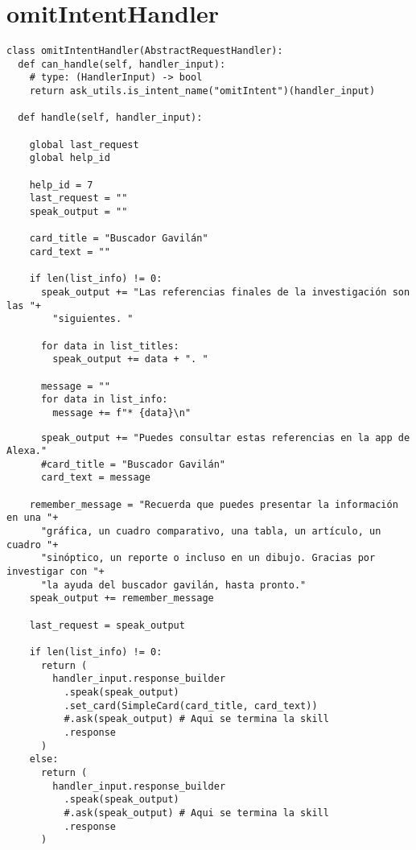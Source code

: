 
\section{omitIntentHandler}
\label{A13Anexo}

\begin{tcolorbox}[colback=white!25!white,colframe=blue]
  \begin{verbatim}
class omitIntentHandler(AbstractRequestHandler):
  def can_handle(self, handler_input):
    # type: (HandlerInput) -> bool
    return ask_utils.is_intent_name("omitIntent")(handler_input)

  def handle(self, handler_input):
        
    global last_request
    global help_id
        
    help_id = 7
    last_request = ""
    speak_output = ""
        
    card_title = "Buscador Gavilán"
    card_text = ""
        
    if len(list_info) != 0:
      speak_output += "Las referencias finales de la investigación son las "+
        "siguientes. "
            
      for data in list_titles:
        speak_output += data + ". "
            
      message = ""
      for data in list_info:
        message += f"* {data}\n"
  \end{verbatim}
\end{tcolorbox}

\begin{tcolorbox}[colback=white!25!white,colframe=blue]
  \begin{verbatim}
      speak_output += "Puedes consultar estas referencias en la app de Alexa."
      #card_title = "Buscador Gavilán"
      card_text = message
      
    remember_message = "Recuerda que puedes presentar la información en una "+
      "gráfica, un cuadro comparativo, una tabla, un artículo, un cuadro "+
      "sinóptico, un reporte o incluso en un dibujo. Gracias por investigar con "+
      "la ayuda del buscador gavilán, hasta pronto."
    speak_output += remember_message
         
    last_request = speak_output
        
    if len(list_info) != 0:
      return (
        handler_input.response_builder
          .speak(speak_output)
          .set_card(SimpleCard(card_title, card_text))
          #.ask(speak_output) # Aqui se termina la skill
          .response
      )
    else:
      return (
        handler_input.response_builder
          .speak(speak_output)
          #.ask(speak_output) # Aqui se termina la skill
          .response
      )
  \end{verbatim}
\end{tcolorbox}

